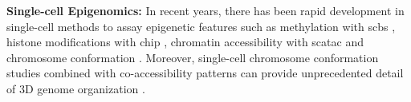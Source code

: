 \textbf{Single-cell Epigenomics: }In recent years, there has been rapid development in single-cell methods to assay epigenetic features such as  methylation with \gls{scbs} \textbf{\cite{smallwood_single-cell_2014}}, %
 histone modifications with \gls{chip} \textbf{\cite{grosselin_high-throughput_2019}}, %
 chromatin accessibility with \gls{scatac} \textbf{\cite{chen_rapid_2018,xu_plate-based_2021,buenrostro_single-cell_2015,satpathy_massively_2019}} and chromosome conformation \textbf{\cite{stevens_3d_2017,dekker_capturing_2002}}. 
 Moreover, single-cell chromosome conformation studies combined with co-accessibility patterns can provide unprecedented detail of 3D genome organization \textbf{\cite{mazan-mamczarz_single-cell_2022}}.\\



